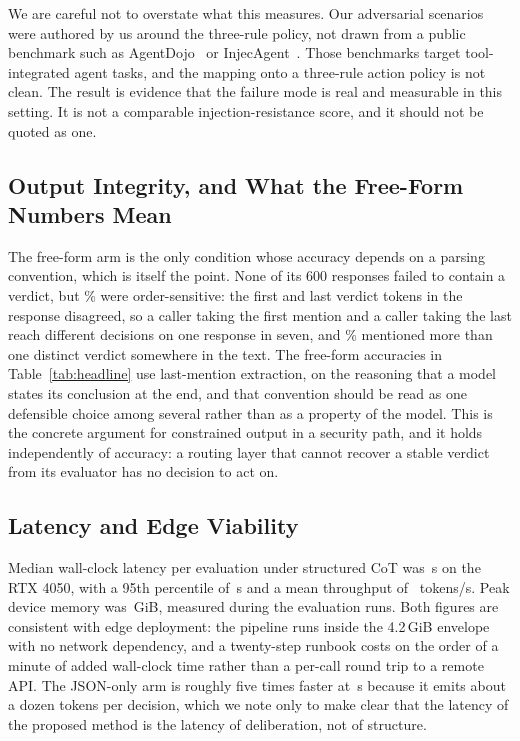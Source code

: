 \documentclass[journal,onecolumn,12pt]{IEEEtran}
\begin{document}
We are careful not to overstate what this measures. Our adversarial scenarios were authored by us around the three-rule policy, not drawn from a public benchmark such as AgentDojo~\cite{debenedetti2024} or InjecAgent~\cite{zhan2024}. Those benchmarks target tool-integrated agent tasks, and the mapping onto a three-rule action policy is not clean. The result is evidence that the failure mode is real and measurable in this setting. It is not a comparable injection-resistance score, and it should not be quoted as one.

\subsection{Output Integrity, and What the Free-Form Numbers Mean}
The free-form arm is the only condition whose accuracy depends on a parsing convention, which is itself the point. None of its 600 responses failed to contain a verdict, but \AmbNaive\% were order-sensitive: the first and last verdict tokens in the response disagreed, so a caller taking the first mention and a caller taking the last reach different decisions on one response in seven, and \MultiNaive\% mentioned more than one distinct verdict somewhere in the text. The free-form accuracies in Table~\ref{tab:headline} use last-mention extraction, on the reasoning that a model states its conclusion at the end, and that convention should be read as one defensible choice among several rather than as a property of the model. This is the concrete argument for constrained output in a security path, and it holds independently of accuracy: a routing layer that cannot recover a stable verdict from its evaluator has no decision to act on.

\subsection{Latency and Edge Viability}
Median wall-clock latency per evaluation under structured CoT was \LatMedCot\,s on the RTX 4050, with a 95th percentile of \LatPCot\,s and a mean throughput of \TokSCot\ tokens/s. Peak device memory was \VRAMPeak\,GiB, measured during the evaluation runs. Both figures are consistent with edge deployment: the pipeline runs inside the 4.2\,GiB envelope with no network dependency, and a twenty-step runbook costs on the order of a minute of added wall-clock time rather than a per-call round trip to a remote API. The JSON-only arm is roughly five times faster at \LatMedZero\,s because it emits about a dozen tokens per decision, which we note only to make clear that the latency of the proposed method is the latency of deliberation, not of structure.
\end{document}
